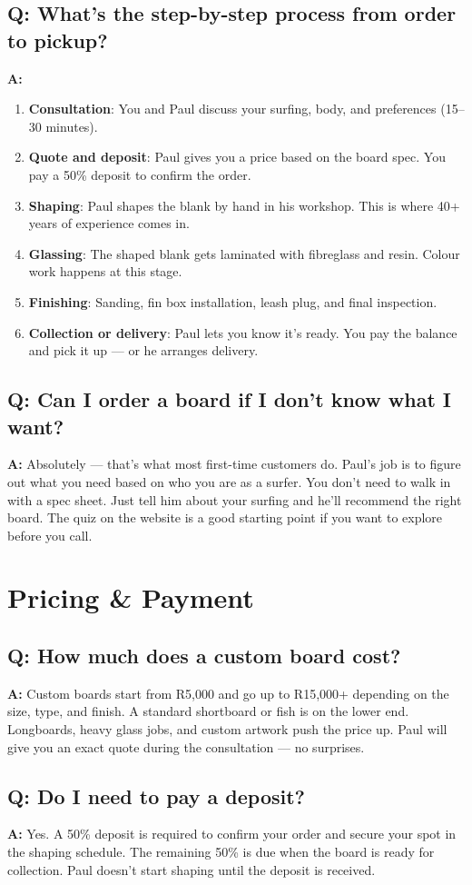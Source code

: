 \documentclass[11pt,a4paper]{article}
\newcommand{\question}[1]{\subsection*{Q: #1}}
\newcommand{\answer}{\noindent\textbf{A:} }
\begin{document}
\question{What's the step-by-step process from order to pickup?}
\answer
\begin{enumerate}[leftmargin=1.5em]
    \item \textbf{Consultation}: You and Paul discuss your surfing, body, and preferences (15--30 minutes).
    \item \textbf{Quote and deposit}: Paul gives you a price based on the board spec. You pay a 50\% deposit to confirm the order.
    \item \textbf{Shaping}: Paul shapes the blank by hand in his workshop. This is where 40+ years of experience comes in.
    \item \textbf{Glassing}: The shaped blank gets laminated with fibreglass and resin. Colour work happens at this stage.
    \item \textbf{Finishing}: Sanding, fin box installation, leash plug, and final inspection.
    \item \textbf{Collection or delivery}: Paul lets you know it's ready. You pay the balance and pick it up --- or he arranges delivery.
\end{enumerate}

\question{Can I order a board if I don't know what I want?}
\answer Absolutely --- that's what most first-time customers do. Paul's job is to figure out what you need based on who you are as a surfer. You don't need to walk in with a spec sheet. Just tell him about your surfing and he'll recommend the right board. The quiz on the website is a good starting point if you want to explore before you call.

\section{Pricing \& Payment}

\question{How much does a custom board cost?}
\answer Custom boards start from R5,000 and go up to R15,000+ depending on the size, type, and finish. A standard shortboard or fish is on the lower end. Longboards, heavy glass jobs, and custom artwork push the price up. Paul will give you an exact quote during the consultation --- no surprises.

\question{Do I need to pay a deposit?}
\answer Yes. A 50\% deposit is required to confirm your order and secure your spot in the shaping schedule. The remaining 50\% is due when the board is ready for collection. Paul doesn't start shaping until the deposit is received.
\end{document}

